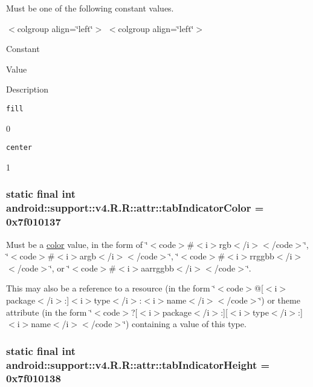 Must be one of the following constant values. \begin{TabularC}{0}
\hline
\end{TabularC}
$<$colgroup align=\char`\"{}left\char`\"{}$>$ $<$colgroup align=\char`\"{}left\char`\"{}$>$ 

Constant

Value

Description 

{\tt fill}

0

{\tt center}

1\hypertarget{classandroid_1_1support_1_1v4_1_1_r_1_1attr_c501a59bd797044d69635ab0c45e1bca}{
\subsubsection[{tabIndicatorColor}]{\setlength{\rightskip}{0pt plus 5cm}static final int android::support::v4.R.R::attr::tabIndicatorColor = 0x7f010137}}
\label{classandroid_1_1support_1_1v4_1_1_r_1_1attr_c501a59bd797044d69635ab0c45e1bca}


Must be a \hyperlink{classandroid_1_1support_1_1v4_1_1_r_1_1color}{color} value, in the form of \char`\"{}$<$code$>$\#$<$i$>$rgb$<$/i$>$$<$/code$>$\char`\"{}, \char`\"{}$<$code$>$\#$<$i$>$argb$<$/i$>$$<$/code$>$\char`\"{}, \char`\"{}$<$code$>$\#$<$i$>$rrggbb$<$/i$>$$<$/code$>$\char`\"{}, or \char`\"{}$<$code$>$\#$<$i$>$aarrggbb$<$/i$>$$<$/code$>$\char`\"{}. 

This may also be a reference to a resource (in the form \char`\"{}$<$code$>$@\mbox{[}$<$i$>$package$<$/i$>$:\mbox{]}$<$i$>$type$<$/i$>$:$<$i$>$name$<$/i$>$$<$/code$>$\char`\"{}) or theme attribute (in the form \char`\"{}$<$code$>$?\mbox{[}$<$i$>$package$<$/i$>$:\mbox{]}\mbox{[}$<$i$>$type$<$/i$>$:\mbox{]}$<$i$>$name$<$/i$>$$<$/code$>$\char`\"{}) containing a value of this type. \hypertarget{classandroid_1_1support_1_1v4_1_1_r_1_1attr_10a3133b861d6ea01189632792d41cbe}{
\subsubsection[{tabIndicatorHeight}]{\setlength{\rightskip}{0pt plus 5cm}static final int android::support::v4.R.R::attr::tabIndicatorHeight = 0x7f010138}}
\label{classandroid_1_1support_1_1v4_1_1_r_1_1attr_10a3133b861d6ea01189632792d41cbe}


